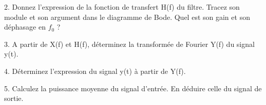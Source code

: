 	\vspace{0.5\baselineskip}
	
	2. Donnez l'expression de la fonction de transfert H(f) du filtre. Tracez son module et son argument dans le diagramme de Bode. Quel est son gain et son déphasage en $f_{0}$ ?
	
	\vspace{0.5\baselineskip}
	
	3. A partir de X(f) et H(f), déterminez la transformée de Fourier Y(f) du signal y(t).
	
	\vspace{0.5\baselineskip}
	
	4. Déterminez l'expression du signal y(t) à partir de Y(f).
	
	\vspace{0.5\baselineskip}
	
	5. Calculez la puissance moyenne du signal d'entrée. En déduire celle du signal de sortie.
	
	\vspace{1\baselineskip}	
	
	
	
